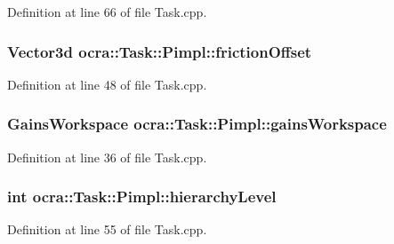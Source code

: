 Definition at line 66 of file Task.\+cpp.

\subsubsection[{\texorpdfstring{friction\+Offset}{frictionOffset}}]{\setlength{\rightskip}{0pt plus 5cm}Vector3d ocra\+::\+Task\+::\+Pimpl\+::friction\+Offset}\hypertarget{structocra_1_1Task_1_1Pimpl_aa11c5e2967e8355b4892155f5dd61a33}{}\label{structocra_1_1Task_1_1Pimpl_aa11c5e2967e8355b4892155f5dd61a33}


Definition at line 48 of file Task.\+cpp.

\subsubsection[{\texorpdfstring{gains\+Workspace}{gainsWorkspace}}]{\setlength{\rightskip}{0pt plus 5cm}Gains\+Workspace ocra\+::\+Task\+::\+Pimpl\+::gains\+Workspace}\hypertarget{structocra_1_1Task_1_1Pimpl_ad21ff79351aaf0c65b020f654d9c5140}{}\label{structocra_1_1Task_1_1Pimpl_ad21ff79351aaf0c65b020f654d9c5140}


Definition at line 36 of file Task.\+cpp.

\subsubsection[{\texorpdfstring{hierarchy\+Level}{hierarchyLevel}}]{\setlength{\rightskip}{0pt plus 5cm}int ocra\+::\+Task\+::\+Pimpl\+::hierarchy\+Level}\hypertarget{structocra_1_1Task_1_1Pimpl_a16b28bba8d6425b4bc7375297dd2cd47}{}\label{structocra_1_1Task_1_1Pimpl_a16b28bba8d6425b4bc7375297dd2cd47}


Definition at line 55 of file Task.\+cpp.


